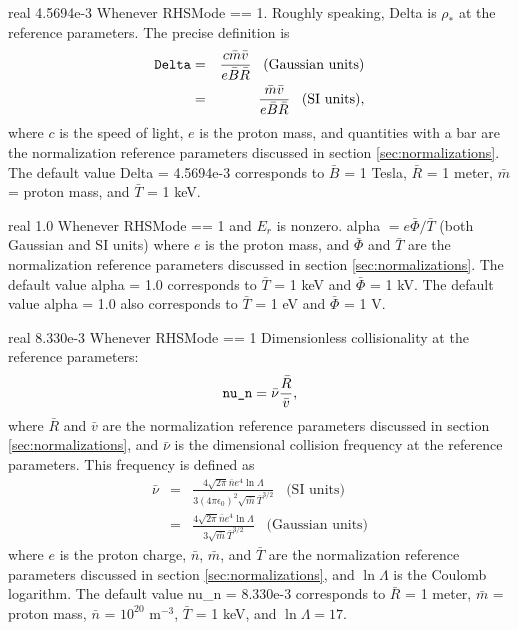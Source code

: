 {real}
{4.5694e-3}
{Whenever {\ttfamily RHSMode} == 1.}
{Roughly speaking, {\ttfamily Delta} is $\rho_*$ at the reference parameters. The precise definition is
\begin{eqnarray}
\mbox{\ttfamily Delta} 
&=& \frac{c \bar{m} \bar{v}}{e \bar{B} \bar{R}} \;\;\; \mbox{(Gaussian units)} \\
&=&  \frac{\bar{m} \bar{v}}{e \bar{B} \bar{R}} \;\;\; \mbox{(SI units)}, \nonumber
\end{eqnarray}
where $c$ is the speed of light,
$e$ is the proton mass,
and quantities with a bar are the normalization reference parameters discussed in section \ref{sec:normalizations}.
The default value {\ttfamily Delta} = 4.5694e-3 corresponds to $\bar{B}$ = 1 Tesla, $\bar{R}$ = 1 meter,
$\bar{m}$ = proton mass, and $\bar{T}$ = 1 keV.}

\myhrule

{real}
{1.0}
{Whenever {\ttfamily RHSMode} == 1 and $E_r$ is nonzero.}
{{\ttfamily alpha} $= e \bar{\Phi}/ \bar{T}$ (both Gaussian and SI units) where $e$ is the proton mass,
and $\bar{\Phi}$ and $\bar{T}$ are the normalization reference parameters discussed in section \ref{sec:normalizations}.
The default value {\ttfamily alpha} = 1.0 corresponds to $\bar{T}$ = 1 keV and $\bar{\Phi}$ = 1 kV.
The default value {\ttfamily alpha} = 1.0 also corresponds to $\bar{T}$ = 1 eV and $\bar{\Phi}$ = 1 V.
}

\myhrule

{real}
{8.330e-3}
{Whenever {\ttfamily RHSMode} == 1}
{Dimensionless collisionality at the reference parameters:
\begin{equation}
\mbox{\ttfamily nu\_n} = \bar{\nu} \frac{\bar{R}}{\bar{v}},
\end{equation}
where $\bar{R}$ and $\bar{v}$ are the normalization reference parameters discussed in section \ref{sec:normalizations},
and $\bar{\nu}$ is the dimensional collision frequency at the reference parameters. This frequency is defined as
\begin{eqnarray}
\bar{\nu}
&=& \frac{4\sqrt{2\pi} \bar{n} e^4 \ln\Lambda}{3 (4\pi\epsilon_0)^2 \sqrt{\bar{m}} \bar{T}^{3/2}} \;\;\; \mbox{(SI units}) \\
&=& \frac{4\sqrt{2\pi} \bar{n} e^4 \ln\Lambda}{3 \sqrt{\bar{m}} \bar{T}^{3/2}} \;\;\; \mbox{(Gaussian units}) \nonumber
\end{eqnarray}
where $e$ is the proton charge, $\bar{n}$, $\bar{m}$, and $\bar{T}$ are the normalization reference parameters discussed in section \ref{sec:normalizations},
and $\ln\Lambda$ is the Coulomb logarithm.
The default value {\ttfamily nu\_n} = 8.330e-3 corresponds to $\bar{R}$ = 1 meter,
$\bar{m}$ = proton mass, $\bar{n}$ = $10^{20}$ m$^{-3}$, $\bar{T}$ = 1 keV, and $\ln\Lambda = 17$.
}

